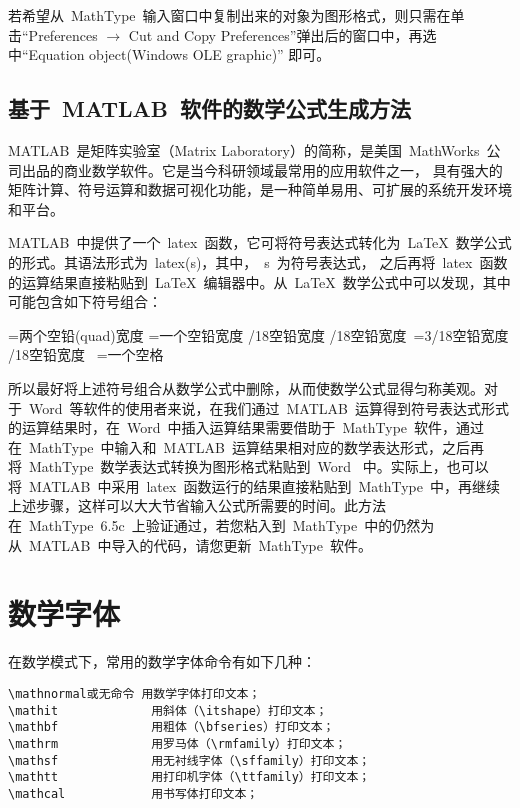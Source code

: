 若希望从~MathType~输入窗口中复制出来的对象为图形格式，则只需在单击“Preferences
$\rightarrow$ Cut and Copy Preferences”弹出后的窗口中，再选中“Equation object(Windows OLE graphic)” 即可。

\subsection{基于~MATLAB~软件的数学公式生成方法}


MATLAB~是矩阵实验室（Matrix Laboratory）的简称，是美国~MathWorks~公司出品的商业数学软件。它是当今科研领域最常用的应用软件之一，
具有强大的矩阵计算、符号运算和数据可视化功能，是一种简单易用、可扩展的系统开发环境和平台。


MATLAB~中提供了一个~latex~函数，它可将符号表达式转化为~\LaTeX~数学公式的形式。其语法形式为~latex(s)，其中，~s~为符号表达式，
之后再将~latex~函数的运算结果直接粘贴到~\LaTeX~编辑器中。从~\LaTeX~数学公式中可以发现，其中可能包含如下符号组合：

\begin{verbatim*}
\qquad=两个空铅(quad)宽度
\quad=一个空铅宽度
/18空铅宽度
/18空铅宽度
\,=3/18空铅宽度
/18空铅宽度
\ =一个空格
\end{verbatim*}

所以最好将上述符号组合从数学公式中删除，从而使数学公式显得匀称美观。对于~Word~等软件的使用者来说，在我们通过~MATLAB~运算得到符号表达式形式的运算结果时，在~Word~中插入运算结果需要借助于~MathType~软件，通过在~MathType~中输入和~MATLAB~运算结果相对应的数学表达形式，之后再将~MathType~数学表达式转换为图形格式粘贴到~Word~ 中。实际上，也可以将~MATLAB~中采用~latex~函数运行的结果直接粘贴到~MathType~中，再继续上述步骤，这样可以大大节省输入公式所需要的时间。此方法在~MathType~6.5c~上验证通过，若您粘入到~MathType~中的仍然为从~MATLAB~中导入的代码，请您更新~MathType~软件。

\section{数学字体}
在数学模式下，常用的数学字体命令有如下几种：

\begin{verbatim}
\mathnormal或无命令 用数学字体打印文本；
\mathit             用斜体（\itshape）打印文本；
\mathbf             用粗体（\bfseries）打印文本；
\mathrm             用罗马体（\rmfamily）打印文本；
\mathsf             用无衬线字体（\sffamily）打印文本；
\mathtt             用打印机字体（\ttfamily）打印文本；
\mathcal            用书写体打印文本；
\end{verbatim}

